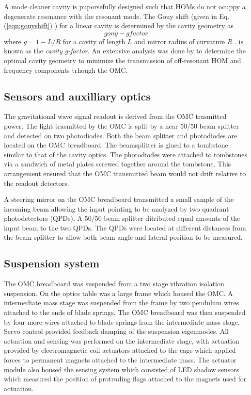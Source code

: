 A mode cleaner cavity is puporsefully designed such that HOMs do not ocuppy a degenerate resonance with the resonant  mode. %
The Gouy shift (given in Eq. %
(\ref{eqn:gouyshift}) ) for a linear cavity is determined by the cavity geometry as 
\begin{equation}
gouy-gfactor
\end{equation}
where $g=1-L/R$ for a cavity of length $L$ and mirror radius of curvature $R$ . %
is known as the \emph{cavity g-factor}. %
An extensive analysis was done by  to determine the optimal cavity geometry to minimize the transmission of off-resonant HOM and frequency components trhough the OMC.

\subsection{Sensors and auxilliary optics}
The gravitational wave signal readout is derived from the OMC trasmitted power. %
The light trasmitted by the OMC is split by a near 50/50 beam splitter and detected on two photodiodes. %
Both the beam splitter and photodiodes are located on the OMC breadboard. %
The beamsplitter is glued to a tombstone similar to that of the cavity optics. %
The photodiodes were attached to tombstones via a sandwich of metal plates screwed together around the tombstone. %
This arrangement ensured that the OMC transmitted beam would not drift relative to the readout detectors.

A steering mirror on the OMC breadboard transmitted a small sample of the incoming beam allowing the input pointing to be analyzed by two quadrant photodetectors (QPDs). %
A 50/50 beam splitter ditributed equal amounts of the input beam to the two QPDs. %
The QPDs were located at different distances from the beam splitter to allow both beam angle and lateral position to be measured.

\subsection{Suspension system}
The OMC breadboard was suspended from a two stage vibration isolation suspension. %
On the optics table was a large  frame which housed the OMC. %
A intermediate mass stage was suspended from the frame by two pendulum wires attached to the ends of blade springs. %
The OMC breadboard was then suspended by four more wires attached to blade springs from the intermediate mass stage. %
Servo control provided feedback damping of the suspension eigenmodes. %
All actuation and sensing was performed on the intermediate stage, with actuation provided by electromagnetic coil actuators attached to the cage which applied forces to permanent magnets attached to the intermediate mass. %
The actuator module also housed the sensing system which consisted of LED shadow sensors which measured the position of protruding flags attached to the magnets used for actuation.

